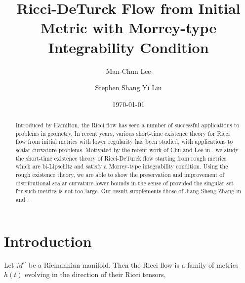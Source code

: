 \documentclass[12pt]{amsart}
\theoremstyle{plain}
\theoremstyle{plain}
\theoremstyle{definition}
\theoremstyle{remark}
\numberwithin{equation}{subsection}
\begin{document}
\title[]
{Ricci-DeTurck Flow from Initial Metric with Morrey-type Integrability Condition}

\author{Man-Chun Lee}
\address[Man-Chun Lee]{Room 237, Lady Shaw Building,
The Chinese University of Hong Kong,
Shatin, N.T., Hong Kong}

\author{Stephen Shang Yi Liu}
\address[Stephen Shang Yi Liu]{Room 222A, Lady Shaw Building,
The Chinese University of Hong Kong,
Shatin, N.T., Hong Kong}

\renewcommand{\subjclassname}{
  \textup{2010} Mathematics Subject Classification}

\date{\today}

\begin{abstract}
    Introduced by Hamilton, the Ricci flow has seen a number of successful applications to problems in geometry. In recent years, various short-time existence theory for Ricci flow from initial metrics with lower regularity has been studied, with applications to scalar curvature problems. Motivated by the recent work of Chu and Lee in \cite{chu_ricci-deturck_2022}, we study the short-time existence theory of Ricci-DeTurck flow starting from rough metrics which are bi-Lipschitz and satisfy a Morrey-type integrability condition. Using the rough existence theory, we are able to show the preservation and improvement of distributional scalar curvature lower bounds in the sense of \cite{lee_positive_2015} provided the singular set for such metrics is not too large. Our result supplements those of Jiang-Sheng-Zhang in \cite{jiang_weak_2021} and \cite{jiang_removable_2022}.
\end{abstract}


\maketitle

%
%
%

\section{Introduction}\label{sec:introduction}

Let $M^n$ be a Riemannian manifold. Then the Ricci flow is a family of metrics $h(t)$ evolving in the direction of their Ricci tensors,
\end{document}
